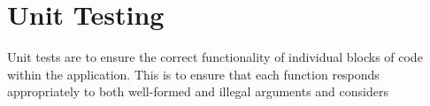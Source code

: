 \section{Unit Testing}

Unit tests are to ensure the correct functionality of individual blocks of code within the application. This is to ensure that each function responds appropriately to both well-formed and illegal arguments and considers 

